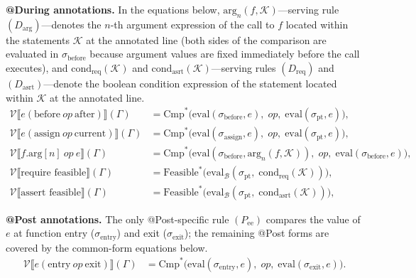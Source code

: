 \documentclass[pdflatex,sn-basic]{sn-jnl}%
\theoremstyle{thmstyleone}%
\theoremstyle{thmstyletwo}%
\theoremstyle{thmstylethree}%
\begin{document}
\smallskip
\textbf{@During annotations.}
In the equations below, $\text{arg}_n(f, \mathcal{K})$---serving rule $(D_{\text{arg}})$---denotes the $n$-th argument expression of the call to $f$ located within the statements $\mathcal{K}$ at the annotated line (both sides of the comparison are evaluated in $\sigma_{\text{before}}$ because argument values are fixed immediately before the call executes), and $\text{cond}_{\text{req}}(\mathcal{K})$ and $\text{cond}_{\text{asrt}}(\mathcal{K})$---serving rules $(D_{\text{req}})$ and $(D_{\text{asrt}})$---denote the boolean condition expression of the statement located within $\mathcal{K}$ at the annotated line.
\begin{align*}
\mathcal{V}\llbracket e(\text{before}\ \mathit{op}\ \text{after}) \rrbracket(\Gamma)
    &= \text{Cmp}^*\bigl(\text{eval}(\sigma_{\text{before}}, e),\; \mathit{op},\; \text{eval}(\sigma_{\text{pt}}, e)\bigr), \\[3pt]
\mathcal{V}\llbracket e(\text{assign}\ \mathit{op}\ \text{current}) \rrbracket(\Gamma)
    &= \text{Cmp}^*\bigl(\text{eval}(\sigma_{\text{assign}}, e),\; \mathit{op},\; \text{eval}(\sigma_{\text{pt}}, e)\bigr), \\[3pt]
\mathcal{V}\llbracket f.\text{arg}[n]\ \mathit{op}\ e \rrbracket(\Gamma)
    &= \text{Cmp}^*\bigl(\text{eval}(\sigma_{\text{before}}, \text{arg}_n(f, \mathcal{K})),\; \mathit{op},\; \text{eval}(\sigma_{\text{before}}, e)\bigr), \\[3pt]
\mathcal{V}\llbracket \text{require feasible} \rrbracket(\Gamma)
    &= \text{Feasible}^*\bigl(\text{eval}_{\mathcal{B}}(\sigma_{\text{pt}},\; \text{cond}_{\text{req}}(\mathcal{K}))\bigr), \\[3pt]
\mathcal{V}\llbracket \text{assert feasible} \rrbracket(\Gamma)
    &= \text{Feasible}^*\bigl(\text{eval}_{\mathcal{B}}(\sigma_{\text{pt}},\; \text{cond}_{\text{asrt}}(\mathcal{K}))\bigr),
\end{align*}

\smallskip
\textbf{@Post annotations.}
The only @Post-specific rule $(P_{\text{ee}})$ compares the value of $e$ at function entry ($\sigma_{\text{entry}}$) and exit ($\sigma_{\text{exit}}$); the remaining @Post forms are covered by the common-form equations below.
\begin{align*}
\mathcal{V}\llbracket e(\text{entry}\ \mathit{op}\ \text{exit}) \rrbracket(\Gamma)
    &= \text{Cmp}^*\bigl(\text{eval}(\sigma_{\text{entry}}, e),\; \mathit{op},\; \text{eval}(\sigma_{\text{exit}}, e)\bigr).
\end{align*}
\end{document}
